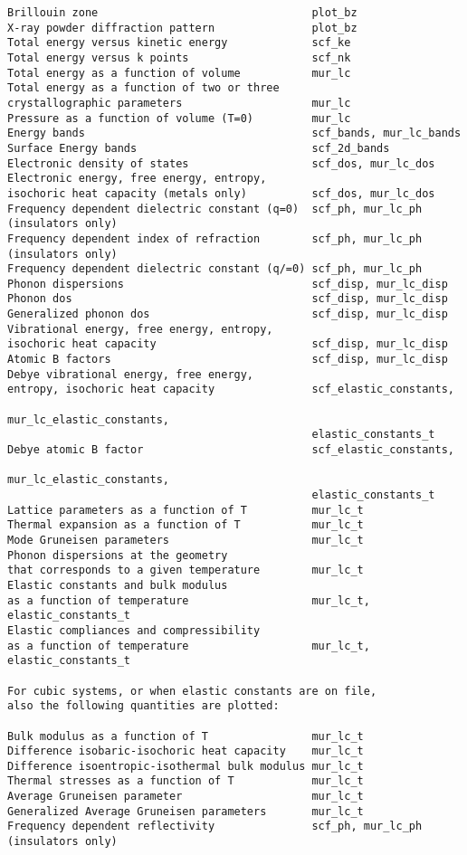 \documentclass[12pt,a4paper]{article}
\begin{document}
\begin{verbatim}
Brillouin zone                                 plot_bz
X-ray powder diffraction pattern               plot_bz
Total energy versus kinetic energy             scf_ke
Total energy versus k points                   scf_nk
Total energy as a function of volume           mur_lc
Total energy as a function of two or three
crystallographic parameters                    mur_lc
Pressure as a function of volume (T=0)         mur_lc
Energy bands                                   scf_bands, mur_lc_bands
Surface Energy bands                           scf_2d_bands
Electronic density of states                   scf_dos, mur_lc_dos
Electronic energy, free energy, entropy,      
isochoric heat capacity (metals only)          scf_dos, mur_lc_dos
Frequency dependent dielectric constant (q=0)  scf_ph, mur_lc_ph
(insulators only)
Frequency dependent index of refraction        scf_ph, mur_lc_ph
(insulators only)
Frequency dependent dielectric constant (q/=0) scf_ph, mur_lc_ph
Phonon dispersions                             scf_disp, mur_lc_disp
Phonon dos                                     scf_disp, mur_lc_disp
Generalized phonon dos                         scf_disp, mur_lc_disp
Vibrational energy, free energy, entropy,      
isochoric heat capacity                        scf_disp, mur_lc_disp
Atomic B factors                               scf_disp, mur_lc_disp
Debye vibrational energy, free energy, 
entropy, isochoric heat capacity               scf_elastic_constants, 
                                               mur_lc_elastic_constants,
                                               elastic_constants_t
Debye atomic B factor                          scf_elastic_constants,
                                               mur_lc_elastic_constants,
                                               elastic_constants_t
Lattice parameters as a function of T          mur_lc_t
Thermal expansion as a function of T           mur_lc_t 
Mode Gruneisen parameters                      mur_lc_t
Phonon dispersions at the geometry 
that corresponds to a given temperature        mur_lc_t
Elastic constants and bulk modulus
as a function of temperature                   mur_lc_t, elastic_constants_t
Elastic compliances and compressibility
as a function of temperature                   mur_lc_t, elastic_constants_t

For cubic systems, or when elastic constants are on file,
also the following quantities are plotted:

Bulk modulus as a function of T                mur_lc_t
Difference isobaric-isochoric heat capacity    mur_lc_t
Difference isoentropic-isothermal bulk modulus mur_lc_t
Thermal stresses as a function of T            mur_lc_t
Average Gruneisen parameter                    mur_lc_t
Generalized Average Gruneisen parameters       mur_lc_t     
Frequency dependent reflectivity               scf_ph, mur_lc_ph
(insulators only)
\end{verbatim}
\end{document}
